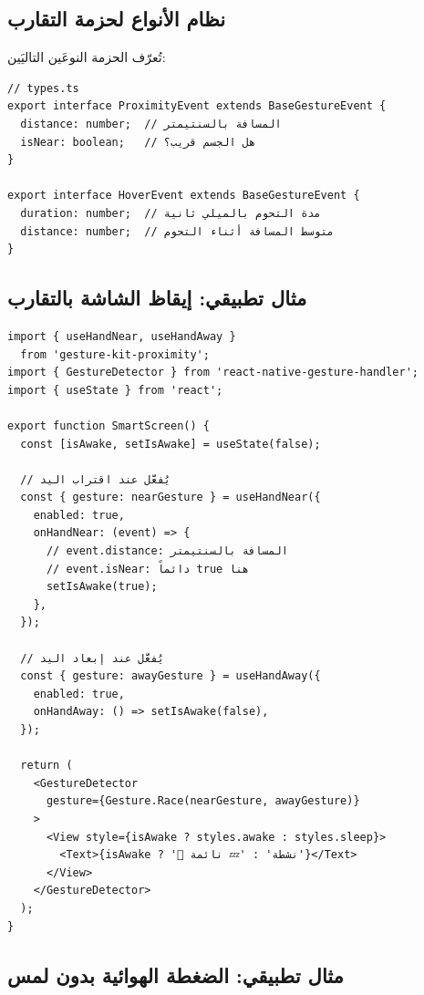 \begin{Arabic}
\subsection{نظام الأنواع لحزمة التقارب}

تُعرّف الحزمة النوعَين التاليَين:

\begin{english}
\begin{verbatim}
// types.ts
export interface ProximityEvent extends BaseGestureEvent {
  distance: number;  // المسافة بالسنتيمتر
  isNear: boolean;   // هل الجسم قريب؟
}

export interface HoverEvent extends BaseGestureEvent {
  duration: number;  // مدة التحوم بالميلي ثانية
  distance: number;  // متوسط المسافة أثناء التحوم
}
\end{verbatim}
\end{english}

\subsection{مثال تطبيقي: إيقاظ الشاشة بالتقارب}

\begin{english}
\begin{verbatim}
import { useHandNear, useHandAway }
  from 'gesture-kit-proximity';
import { GestureDetector } from 'react-native-gesture-handler';
import { useState } from 'react';

export function SmartScreen() {
  const [isAwake, setIsAwake] = useState(false);

  // يُفعَّل عند اقتراب اليد
  const { gesture: nearGesture } = useHandNear({
    enabled: true,
    onHandNear: (event) => {
      // event.distance: المسافة بالسنتيمتر
      // event.isNear: دائماً true هنا
      setIsAwake(true);
    },
  });

  // يُفعَّل عند إبعاد اليد
  const { gesture: awayGesture } = useHandAway({
    enabled: true,
    onHandAway: () => setIsAwake(false),
  });

  return (
    <GestureDetector
      gesture={Gesture.Race(nearGesture, awayGesture)}
    >
      <View style={isAwake ? styles.awake : styles.sleep}>
        <Text>{isAwake ? '🌟 نشطة' : '💤 نائمة'}</Text>
      </View>
    </GestureDetector>
  );
}
\end{verbatim}
\end{english}

\subsection{مثال تطبيقي: الضغطة الهوائية بدون لمس}


\end{Arabic}
